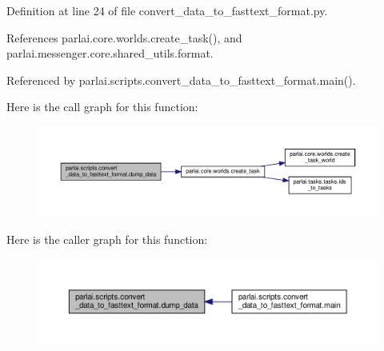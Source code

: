 Definition at line 24 of file convert\+\_\+data\+\_\+to\+\_\+fasttext\+\_\+format.\+py.



References parlai.\+core.\+worlds.\+create\+\_\+task(), and parlai.\+messenger.\+core.\+shared\+\_\+utils.\+format.



Referenced by parlai.\+scripts.\+convert\+\_\+data\+\_\+to\+\_\+fasttext\+\_\+format.\+main().

Here is the call graph for this function\+:
\nopagebreak
\begin{figure}[H]
\begin{center}
\leavevmode
\includegraphics[width=350pt]{namespaceparlai_1_1scripts_1_1convert__data__to__fasttext__format_a8222f98bd2353f75b192224da0e07733_cgraph}
\end{center}
\end{figure}
Here is the caller graph for this function\+:
\nopagebreak
\begin{figure}[H]
\begin{center}
\leavevmode
\includegraphics[width=350pt]{namespaceparlai_1_1scripts_1_1convert__data__to__fasttext__format_a8222f98bd2353f75b192224da0e07733_icgraph}
\end{center}
\end{figure}
\mbox{\label{namespaceparlai_1_1scripts_1_1convert__data__to__fasttext__format_adef5d250b1de0b6c868a9eb4e699a81f}} 
